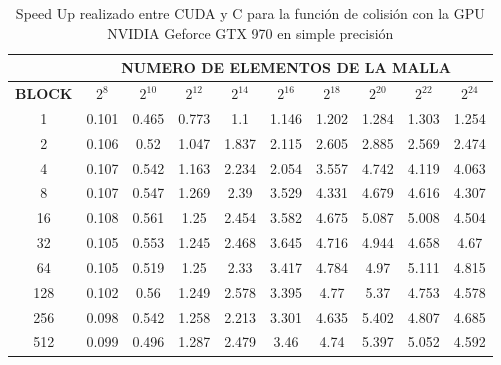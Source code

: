\begin{table}[h!]
\centering
    \begin{tabular}{|c|c|c|c|c|c|c|c|c|c|}
    \hline
                   & \multicolumn{9}{c|}{\textbf{NUMERO DE ELEMENTOS DE LA MALLA}} \\ \hline
    \textbf{BLOCK} & $2^{8}$ & $2^{10}$& $2^{12}$& $2^{14}$& $2^{16}$& $2^{18}$& $2^{20}$& $2^{22}$& $2^{24}$\\ \hline
		1                               & 0.101   & 0.465    & 0.773    & 1.1      & 1.146    & 1.202    & 1.284    & 1.303    & 1.254 \\ \hline
		2                               & 0.106   & 0.52     & 1.047    & 1.837    & 2.115    & 2.605    & 2.885    & 2.569    & 2.474 \\ \hline
		4                               & 0.107   & 0.542    & 1.163    & 2.234    & 2.054    & 3.557    & 4.742    & 4.119    & 4.063 \\ \hline
		8                               & 0.107   & 0.547    & 1.269    & 2.39     & 3.529    & 4.331    & 4.679    & 4.616    & 4.307 \\ \hline
		16                              & 0.108   & 0.561    & 1.25     & 2.454    & 3.582    & 4.675    & 5.087    & 5.008    & 4.504 \\ \hline
		32                              & 0.105   & 0.553    & 1.245    & 2.468    & 3.645    & 4.716    & 4.944    & 4.658    & 4.67  \\ \hline
		64                              & 0.105   & 0.519    & 1.25     & 2.33     & 3.417    & 4.784    & 4.97     & 5.111    & 4.815 \\ \hline
		128                             & 0.102   & 0.56     & 1.249    & 2.578    & 3.395    & 4.77     & 5.37     & 4.753    & 4.578 \\ \hline
		256                             & 0.098   & 0.542    & 1.258    & 2.213    & 3.301    & 4.635    & 5.402    & 4.807    & 4.685 \\ \hline
		512                             & 0.099   & 0.496    & 1.287    & 2.479    & 3.46     & 4.74     & 5.397    & 5.052    & 4.592 \\ \hline
    \end{tabular}
    \caption{Speed Up realizado entre CUDA y C para la función de colisión con la GPU NVIDIA Geforce GTX 970 en simple precisión}
    \label{tab:s_cuda_970_test_simple_10}
    \end{table}
